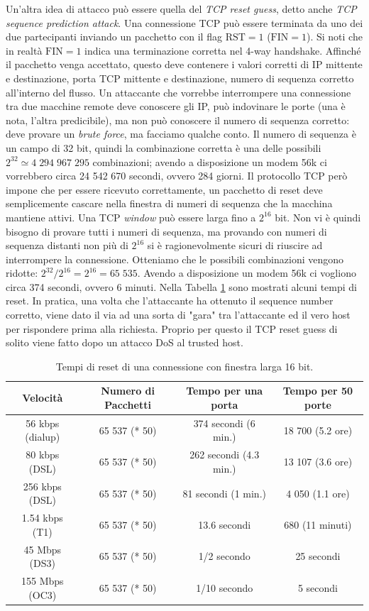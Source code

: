 Un'altra idea di attacco può essere quella del \textit{TCP reset guess}, detto anche \textit{TCP sequence prediction attack}. Una connessione TCP può essere terminata da uno dei due partecipanti inviando un pacchetto con il flag $\text{RST}=1$ ($\text{FIN}=1$). Si noti che in realtà $\text{FIN}=1$ indica una terminazione corretta nel 4-way handshake. Affinché il pacchetto venga accettato, questo deve contenere i valori corretti di IP mittente e destinazione, porta TCP mittente e destinazione, numero di sequenza corretto all'interno del flusso. Un attaccante che vorrebbe interrompere una connessione tra due macchine remote deve conoscere gli IP, può indovinare le porte (una è nota, l'altra predicibile), ma non può conoscere il numero di sequenza corretto: deve provare un \textit{brute force}, ma facciamo qualche conto. Il numero di sequenza è un campo di 32 bit, quindi la combinazione corretta è una delle possibili $2^{32} \simeq 4\;294\;967\;295$ combinazioni; avendo a disposizione un modem 56k ci vorrebbero circa 24 542 670 secondi, ovvero 284 giorni. Il protocollo TCP però impone che per essere ricevuto correttamente, un pacchetto di reset deve semplicemente cascare nella finestra di numeri di sequenza che la macchina mantiene attivi. Una TCP \textit{window} può essere larga fino a $2^{16}$ bit. Non vi è quindi bisogno di provare tutti i numeri di sequenza, ma provando con numeri di sequenza distanti non più di $2^{16}$ si è ragionevolmente sicuri di riuscire ad interrompere la connessione. Otteniamo che le possibili combinazioni vengono ridotte: $2^{32}/2^{16} = 2^{16} = 65\;535$. Avendo a disposizione un modem 56k ci vogliono circa 374 secondi, ovvero 6 minuti. Nella Tabella \ref{tab:TCP-reset-guess} sono mostrati alcuni tempi di reset.  In pratica, una volta che l'attaccante ha ottenuto il sequence number corretto, viene dato il via ad una sorta di "gara" tra l'attaccante ed il vero host per rispondere prima alla richiesta. Proprio per questo il TCP reset guess di solito viene fatto dopo un attacco DoS al trusted host.
\begin{table}[t!]
	\centering
	\begin{tabular}{cccc}
		\toprule[0.5ex]
		\textbf{Velocità} & \textbf{Numero di Pacchetti} & \textbf{Tempo per una porta} & \textbf{Tempo per 50 porte}\\
		\midrule
		56 kbps (dialup) & 65 537 (* 50) & 374 secondi (6 min.) & 18 700 (5.2 ore)\\
		80 kbps (DSL) & 65 537 (* 50) & 262 secondi (4.3 min.) & 13 107 (3.6 ore)\\
		256 kbps (DSL) & 65 537 (* 50) & 81 secondi (1 min.) & 4 050 (1.1 ore)\\
		1.54 kbps (T1) & 65 537 (* 50) & 13.6 secondi & 680 (11 minuti)\\
		45 Mbps (DS3) & 65 537 (* 50) & 1/2 secondo & 25 secondi\\
		155 Mbps (OC3) & 65 537 (* 50) & 1/10 secondo & 5 secondi\\
		\bottomrule[0.5ex]
	\end{tabular}
	\caption{Tempi di reset di una connessione con finestra larga 16 bit.}
	\label{tab:TCP-reset-guess}
\end{table}

